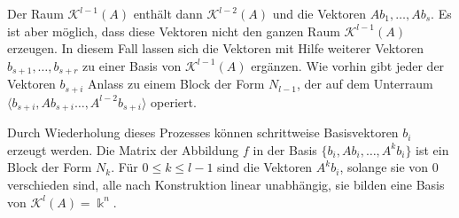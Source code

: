 Der Raum $\mathcal{K}^{l-1}(A)$ enthält dann $\mathcal{K}^{l-2}(A)$ und
die Vektoren $Ab_1,\dots,Ab_s$.
Es ist aber möglich, dass diese Vektoren nicht den ganzen Raum
$\mathcal{K}^{l-1}(A)$ erzeugen.
In diesem Fall lassen sich die Vektoren mit Hilfe weiterer Vektoren
$b_{s+1},\dots,b_{s+r}$ zu einer Basis von $\mathcal{K}^{l-1}(A)$
ergänzen.
Wie vorhin gibt jeder der Vektoren $b_{s+i}$ Anlass zu einem Block
der Form $N_{l-1}$, der auf dem Unterraum
$\langle b_{s+i},Ab_{s+i}\dots,A^{l-2}b_{s+i}\rangle$
operiert.

Durch Wiederholung dieses Prozesses können schrittweise Basisvektoren
$b_i$ erzeugt werden.
Die Matrix der Abbildung $f$ in der Basis $\{b_i,Ab_i,\dots,A^kb_i\}$
ist ein Block der Form $N_k$.
Für $0\le k\le l-1$ sind die Vektoren $A^kb_i$,
solange sie von $0$ verschieden sind,
alle nach Konstruktion linear unabhängig, sie bilden eine Basis
von $\mathcal{K}^l(A)=\Bbbk^n$.


